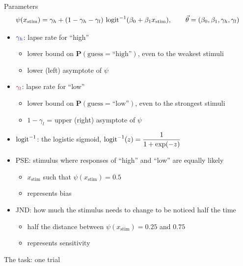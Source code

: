 \begin{frame}{Parameters}
  \[
    \psi(x_\text{stim}) = \gamma_h + (1-\gamma_h-\gamma_l)\,
                          \operatorname{logit}^{-1}(\beta_0 + \beta_1 x_\text{stim}),
    \qquad \vec{\theta} = (\beta_0, \beta_1, \gamma_h, \gamma_l)
  \]
  \begin{itemize}
    \item ${\color{blue}\gamma_h}$: lapse rate for ``high''
    \begin{itemize}
      \item lower bound on $\mathbf{P}(\text{guess} = \text{``high''})$, even to the weakest stimuli
      \item lower (left) asymptote of $\psi$
    \end{itemize}
    \item ${\color{purple}\gamma_l}$: lapse rate for ``low''
    \begin{itemize}
      \item lower bound on $\mathbf{P}(\text{guess} = \text{``low''})$, even to the strongest stimuli
      \item $1-\gamma_l$ = upper (right) asymptote of $\psi$
    \end{itemize}
    \item $\operatorname{logit}^{-1}$: the logistic sigmoid, $\operatorname{logit}^{-1}(z) = \dfrac{1}{1+\exp(-z)}$
    \item PSE: stimulus where responses of ``high'' and ``low'' are equally likely
    \begin{itemize}
      \item $x_\text{stim}$ such that $\psi(x_\text{stim}) = 0.5$
      \item represents bias
    \end{itemize}
    \item JND: how much the stimulus needs to change to be noticed half the time
    \begin{itemize}
      \item half the distance between $\psi(x_\text{stim}) = 0.25$ and $0.75$
      \item represents sensitivity
    \end{itemize}
  \end{itemize}
\end{frame}

\begin{frame}{The task: one trial}
  \centering
\end{frame}


